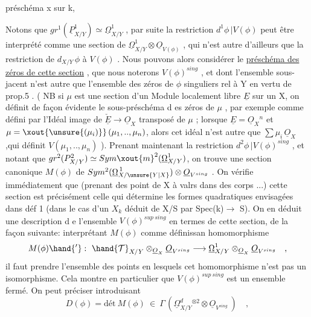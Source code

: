 
préschéma x sur k, 

Notons que $gr^1(\underline{P}^1_{X/Y}) \simeq \underline{\Omega}^1_{X/Y}$ , par suite la restriction
$d^1\phi\,|V(\phi)$ peut être interprété comme une section de $\underline{\Omega}^1_{X/Y} \otimes \underline{O}_{V(\phi)}$ ,
qui n'est autre d'ailleurs que la restriction de $d_{X/Y}\,\phi$ à $V(\phi)$ . Nous
pouvons alors considérer le \uline{préschéma des zéros de cette section} , que
nous noterons $V(\phi)^{sing}$ , et dont l'ensemble sous-jacent n'est autre
que l'ensemble des zéros de $\phi$ singuliers rel à Y en vertu de prop.5 .
( NB si \xout{\unsure{$\phi$}} $\mu$ est une section d'un Module localement libre  $\underline{E}$ sur un
\margin{$\|$}  X, on définit de façon évidente le sous-préschéma d es
zéros de $\mu$ , par exemple comme défini par l'Idéal image de $\check{\underline{E}} \longrightarrow \underline{O}_X$
transposé de $\mu$ ; lorsque $\underline{E} = \underline{O}_X{}^n$ et $\mu = \xout{\unsure{(\mu_i)}}\,(\mu_1,..,\mu_n)$, alors cet
idéal n'est autre que $\sum \mu_i\,\underline{O}_X$ ,qui définit $V(\mu_1,..,\mu_n)$ ). Prenant
maintenant la restriction $d^2\phi\,|V(\phi)^{sing}$ , et notant que
$gr^2(P^2_{X/Y}) \simeq Sym\xout{m}^2(\underline{\Omega}^1_{X/Y})$, on trouve une section canonique $M(\phi)$ de
$Sym^2(\underline{\Omega}^{\,1}_{X/\unsure{Y|X}}) \otimes \underline{O}_{V^{sing}}$ . On vérifie immédiatement que (prenant des
\margin{$\|$}point de X à valrs dans des corps ...) cette section est précisément
celle qui détermine les formes quadratiques envisagées dans déf 1
(dans le cas  d'un $X_k$ déduit de X/S par Spec(k)$\rightarrow$ S). On
en déduit une description d e l'ensemble $V(\phi)^{sup\ sing}$ en termes de
cette section, de la façon suivante: interprétant $M(\phi)$ comme définissan
homomorphisme
\[
M(\phi)\hand{'} : \ \hand{\mathcal{T}}_{X/Y} \otimes_{\underline{O}_X} \underline{O}_{V^{sing}} \longrightarrow \underline{\Omega}^1_{X/Y} \otimes_{\underline{O}_X} \underline{O}_{V^{sing}} \quad ,
\]
il faut prendre l'ensemble des points en lesquels cet homomorphisme
n'est pas un isomorphisme. Cela montre en particulier que $V(\phi)^{sup\ sing}$
est un ensemble fermé. On peut  préciser  introduisant
\[
D(\phi) = \text{dét}\ M(\phi) \ \in \ \Gamma\,(\underline{\Omega}^d_{X/Y}{}^{\otimes 2} \otimes \underline{O}_{V^{sing}}\ ) \quad ,
\]

